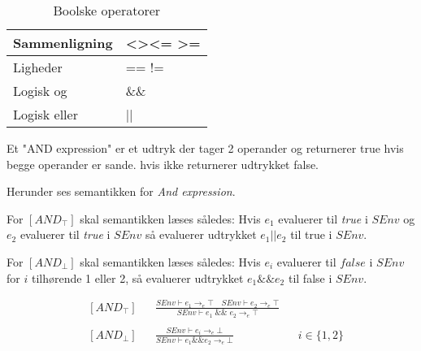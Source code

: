 \begin{table}[H]
    \centering
    \begin{tabular}{|l|l|}
        \hline
        \centering

        Sammenligning      & \textless \quad \textgreater \quad \textless= \quad\textgreater= \\ \hline
        Ligheder           & == \quad !=                                                      \\ \hline
        Logisk og          & \&\&                                                              \\ \hline
        Logisk eller       & ||                                                               \\ \hline


    \end{tabular}
    \caption{Boolske operatorer}
    \label{tab:operatorerbool}
\end{table}

\noindent Et "AND expression" er et udtryk der tager 2 operander og returnerer true hvis begge operander er sande. hvis ikke returnerer udtrykket false.

\noindent Herunder ses semantikken for \textit{And expression}. 

\noindent For $[AND_\top]$ skal semantikken læses således: Hvis $e_1$ evaluerer til \textit{true} i $SEnv$ og $e_2$ evaluerer til \textit{true} i $SEnv$ så evaluerer udtrykket $e_1 || e_2$ til true i $SEnv$. 

\noindent For $[AND_\bot]$ skal semantikken læses således: Hvis $e_i$ evaluerer til $false$ i $SEnv$  for $i$ tilhørende 1 eller 2, så evaluerer udtrykket $e_1  \&\&  e_2$ til false i $SEnv$.

\begin{align*}
&[AND_\top] & &\frac{SEnv \vdash e_1 \rightarrow_e \top \quad SEnv \vdash e_2 \rightarrow_e \top}{SEnv \vdash e_1\; \&\&\; e_2 \rightarrow_e \top}\\\\
&[AND_\bot] & &\frac{SEnv \vdash e_i \rightarrow_e \bot}{SEnv \vdash e_1 \&\& e_2 \rightarrow_e \bot} & &i \in \{1, 2\}\\\\
\end{align*}        


